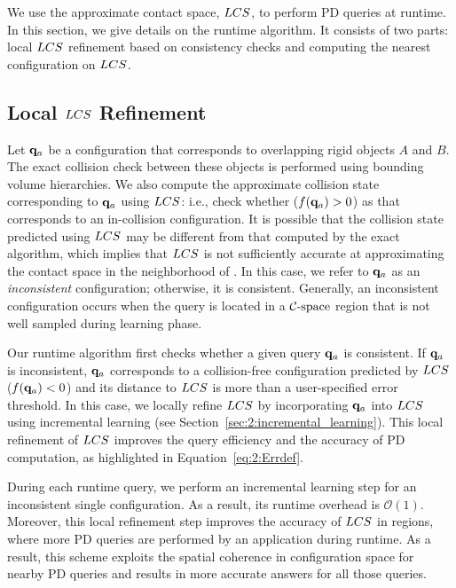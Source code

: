 We use the approximate contact space, $LCS$, to perform PD queries at
runtime. In this section, we give details on the runtime
algorithm. It consists of two parts: local $LCS$ refinement based on consistency checks and
computing the nearest configuration on $LCS$.


\subsection{Local $LCS$ Refinement}
Let $\mathbf q_a$ be a configuration that corresponds to overlapping rigid objects $A$
and $B$. The exact collision check  between these objects is performed using
bounding volume hierarchies. We also compute the approximate collision state corresponding to $\mathbf q_a$ using $LCS$: i.e.,
check whether ($f(\mathbf q_a)>0$) as that corresponds to an in-collision configuration.
It is possible that the collision state predicted
using $LCS$ may be different from that computed by the  exact
algorithm, which implies that $LCS$ is not sufficiently
accurate at approximating the contact space in the neighborhood of \qa.
In this case, we refer to $\mathbf q_a$ as an \emph{inconsistent} configuration;
otherwise, it is consistent.
Generally, an inconsistent configuration occurs when the query is located in
a $\mathcal C\text{-space}$ region that is not well sampled during learning phase.

Our runtime algorithm first checks
whether a given query $\mathbf q_a$ is consistent. If $\mathbf q_a$ is inconsistent, $\mathbf q_a$ corresponds to a collision-free configuration
predicted by $LCS$ ($f(\mathbf q_a)<0$) and its distance to $LCS$ is
more than a user-specified error threshold. In this case, we locally refine
$LCS$ by incorporating $\mathbf q_a$ into $LCS$ using incremental learning (see
Section~\ref{sec:2:incremental_learning}).
This local refinement of $LCS$ improves the query efficiency and the accuracy of PD computation, as highlighted in Equation~\ref{eq:2:Errdef}.

During each runtime query, we perform an incremental learning step for an inconsistent
single configuration. As a result, its runtime overhead is $\mathcal O(1)$.
Moreover, this local refinement step improves the accuracy of $LCS$ in
regions, where more PD queries are performed by an application during runtime. As a result, this scheme
exploits the spatial coherence in configuration space for nearby PD queries
and results in more accurate answers for all those queries.


